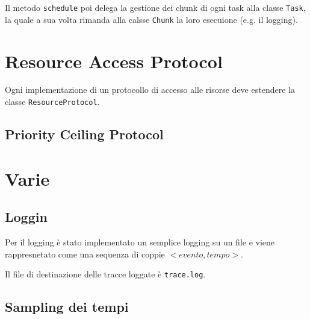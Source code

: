 \myskip

Il metodo \texttt{schedule} poi delega la gestione dei chunk di ogni task alla classe \texttt{Task}, la quale a sua volta rimanda alla calsse \texttt{Chunk} la loro esecuione (e.g. il logging).

\section{Resource Access Protocol}
Ogni implementazione di un protocollo di accesso alle risorse deve estendere la classe \texttt{ResourceProtocol}.

\subsection{Priority Ceiling Protocol}

\section{Varie}

\subsection{Loggin}
Per il logging è stato implementato un semplice logging su un file e viene rappresnetato come una sequenza di coppie $<evento,tempo>$.

Il file di destinazione delle tracce loggate è \texttt{trace.log}.

\subsection{Sampling dei tempi}